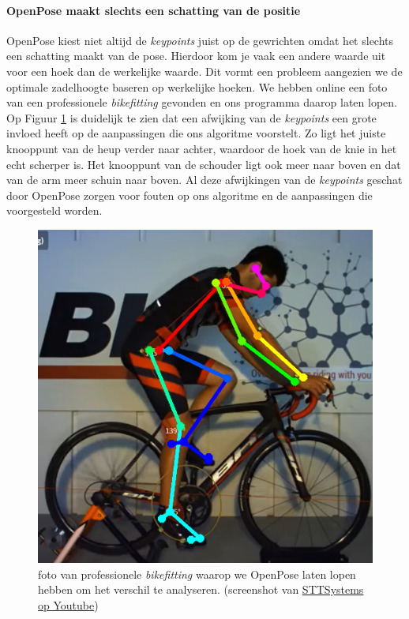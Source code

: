 \documentclass[a4paper,twoside,kulak]{kulakreport}
\begin{document}
\paragraph{OpenPose maakt slechts een schatting van de positie}
OpenPose kiest niet altijd de \textit{keypoints} juist op de gewrichten omdat het slechts een schatting maakt van de pose. Hierdoor kom je vaak een andere waarde uit voor een hoek dan de werkelijke waarde. Dit vormt een probleem aangezien we de optimale zadelhoogte baseren op werkelijke hoeken. We hebben online een foto van een professionele \textit{bikefitting} gevonden en ons programma daarop laten lopen. Op Figuur \ref{proffessionele_bikefit} is duidelijk te zien dat een afwijking van de \textit{keypoints} een grote invloed heeft op de aanpassingen die ons algoritme voorstelt. Zo ligt het juiste knooppunt van de heup verder naar achter, waardoor de hoek van de knie in het echt scherper is. Het knooppunt van de schouder ligt ook meer naar boven en dat van de arm meer schuin naar boven. Al deze afwijkingen van de \textit{keypoints} geschat door OpenPose zorgen voor fouten op ons algoritme en de aanpassingen die voorgesteld worden.

\begin{figure}[H]
	\centering
	\includegraphics[width= \textwidth]{prof_bikefit}
	
	\caption{foto van professionele \textit{bikefitting} waarop we OpenPose laten lopen hebben om het verschil te analyseren. (screenshot van \href{https://www.youtube.com/watch?v=CTYmJi6zH6oabchannel=STTSystems}{STTSystems op Youtube})}
	\label{proffessionele_bikefit}
\end{figure}
\end{document}
